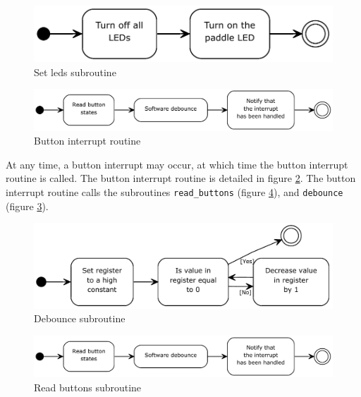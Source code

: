 \begin{figure}
\includegraphics[width = \textwidth]{description-and-methodology/program-flow/set-leds.pdf}
\caption{Set leds subroutine}
\label{fig:set-leds}
\end{figure}

\begin{figure}
\includegraphics[width = \textwidth]{description-and-methodology/program-flow/button-interrupt-routine.pdf}
\caption{Button interrupt routine}
\label{fig:button-interrupt-routine}
\end{figure}

At any time, a button interrupt may occur, at which time the button interrupt routine is called.
The button interrupt routine is detailed in figure \ref{fig:button-interrupt-routine}.
The button interrupt routine calls the subroutines \texttt{read\_buttons} (figure \ref{fig:read-buttons}), and \texttt{debounce} (figure \ref{fig:debounce}).

\begin{figure}
\includegraphics[width = \textwidth]{description-and-methodology/program-flow/debounce.pdf}
\caption{Debounce subroutine}
\label{fig:debounce}
\end{figure}

\begin{figure}
\includegraphics[width = \textwidth]{description-and-methodology/program-flow/read-buttons.pdf}
\caption{Read buttons subroutine}
\label{fig:read-buttons}
\end{figure}

